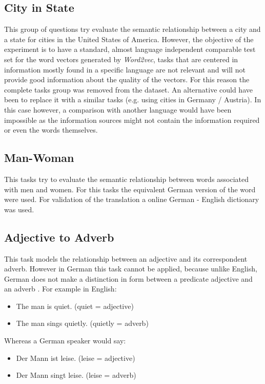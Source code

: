 \subsection{City in State}
\label{sec:sub_sec_city_in_state}
This group of questions try evaluate the semantic relationship between a city
and a state for cities in the United States of America.  However, the
objective of the experiment is to have a standard,  almost
language independent comparable test set for the word vectors generated by \textit{Word2vec}, tasks that
are centered in information mostly found in a specific language are not relevant and
will not provide good information about the quality of the vectors. For this
reason the complete tasks group was removed from the dataset. An alternative could have been to replace it with a similar
tasks (e.g. using cities in Germany / Austria). In this case however, a
comparison with another language would have been impossible as the
information sources might not contain the  information required or even the words
themselves.

\subsection{Man-Woman}
\label{sec:sub_sec_man_woman}
This tasks try to evaluate the semantic relationship between words associated
with men and women. For this tasks the equivalent German version of the word
were used. For validation of the translation  a online German - English
dictionary was used.

\subsection{Adjective to Adverb}
\label{sec:sub_sec_adjetive_adverb}
This task models the relationship between an adjective and its correspondent
adverb. However in German this task cannot be applied,  because unlike English,
German does not make a distinction in form between a predicate adjective and
an adverb \cite{durrell2011hammer}. For example in English:

\begin{itemize}
\item The man is quiet. (quiet = adjective)
\item The man sings quietly. (quietly = adverb)
\end{itemize}

Whereas a German speaker would say:

\begin{itemize}
\item Der Mann ist leise. (leise = adjective)
\item Der Mann singt leise. (leise = adverb)
\end{itemize}

